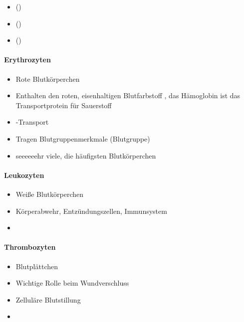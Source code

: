 \begin{itemize}
    \item {} ()
    \item {} ()
    \item {} ()
\end{itemize}

\paragraph{Erythrozyten}
\label{topic:erythrozyten}%
%
%
%

\begin{itemize}
    \item Rote Blutkörperchen
    \item Enthalten den roten, eisenhaltigen Blutfarbstoff
    , das Hämoglobin ist
    das Transportprotein für Sauerstoff
    \item {}-Transport
    \item Tragen Blutgruppenmerkmale (Blutgruppe)
    \item seeeeeehr viele, die häufigsten Blutkörperchen
\end{itemize}

\paragraph{Leukozyten}
\label{topic:leukozyten}%
%
% 
%

\begin{itemize}
    \item Weiße Blutkörperchen
    \item Körperabwehr, Entzündungszellen, Immunsystem 
    \item
\end{itemize}

\paragraph{Thrombozyten}
\label{topic:thrombozyten}
%

\begin{itemize}
    \item {}Blutplättchen
    \item Wichtige Rolle beim Wundverschluss
    \item Zelluläre Blutstillung
    \item
\end{itemize}

